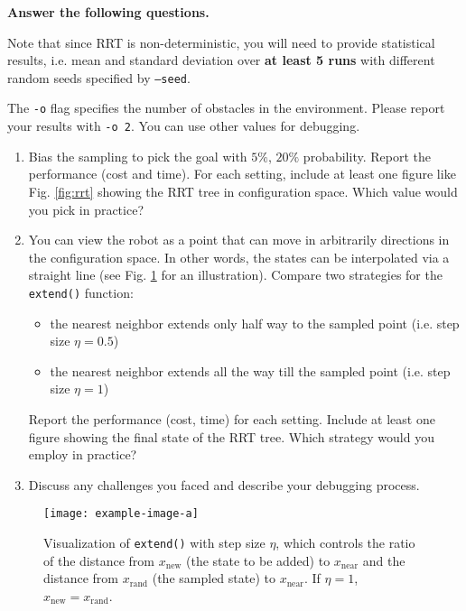 \documentclass[tp]{lcc}
\begin{document}
\textbf{Answer the following questions.}

Note that since RRT is non-deterministic, you will need to provide statistical results, i.e. mean and standard deviation over \textbf{at least 5 runs} with different random seeds specified by \texttt{--seed}.

The \texttt{-o} flag specifies the number of obstacles in the environment. Please report your results with \texttt{-o 2}. You can use other values for debugging.

\begin{enumerate}
    \item Bias the sampling to pick the goal with $5\%$, $20\%$ probability. Report the performance (cost and time). For each setting, include at least one figure like Fig. \ref{fig:rrt} showing the RRT tree in configuration space. Which value would you pick in practice?
    \item You can view the robot as a point that can move in arbitrarily directions in the configuration space. In other words, the states can be interpolated via a straight line (see Fig. \ref{fig:extend} for an illustration). Compare two strategies for the \texttt{extend()} function:
    \begin{itemize}
        \item the nearest neighbor extends only half way to the sampled point (i.e. step size $\eta=0.5$)
        \item the nearest neighbor extends all the way till the sampled point (i.e. step size $\eta=1$)
    \end{itemize}
    Report the performance (cost, time) for each setting. Include at least one figure showing the final state of the RRT tree. Which strategy would you employ in practice?
    \item Discuss any challenges you faced and describe your debugging process.
\end{enumerate}

\begin{figure}[h]
    \centering
    \texttt{[image: example-image-a]}
    \caption{Visualization of \texttt{extend()} with step size $\eta$, which controls the ratio of the distance from $x_{\text{new}}$ (the state to be added) to $x_{\text{near}}$ and the distance from $x_{\text{rand}}$ (the sampled state) to $x_{\text{near}}$. If $\eta=1$, $x_{\text{new}}=x_{\text{rand}}$.}
    \label{fig:extend}
\end{figure}
\end{document}
